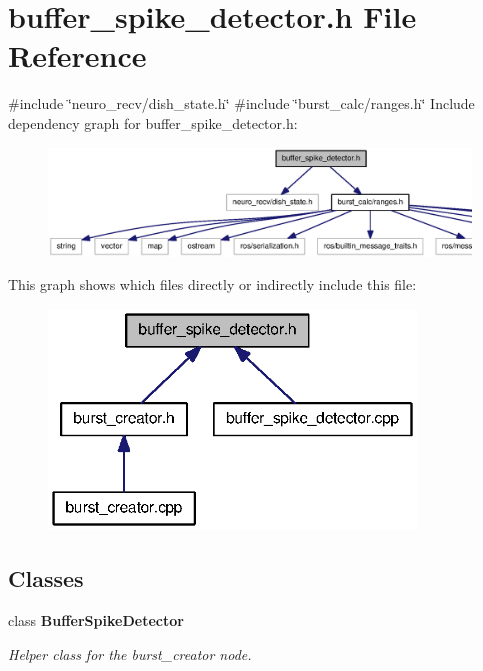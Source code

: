 \section{buffer\-\_\-spike\-\_\-detector.\-h \-File \-Reference}
\label{buffer__spike__detector_8h}
{\ttfamily \#include \char`\"{}neuro\-\_\-recv/dish\-\_\-state.\-h\char`\"{}}\*
{\ttfamily \#include \char`\"{}burst\-\_\-calc/ranges.\-h\char`\"{}}\*
\-Include dependency graph for buffer\-\_\-spike\-\_\-detector.\-h\-:\nopagebreak
\begin{figure}[H]
\begin{center}
\leavevmode
\includegraphics[width=350pt]{buffer__spike__detector_8h__incl}
\end{center}
\end{figure}
\-This graph shows which files directly or indirectly include this file\-:\nopagebreak
\begin{figure}[H]
\begin{center}
\leavevmode
\includegraphics[width=277pt]{buffer__spike__detector_8h__dep__incl}
\end{center}
\end{figure}
\subsection*{\-Classes}
\begin{DoxyCompactItemize}
\item 
class {\bf \-Buffer\-Spike\-Detector}
\begin{DoxyCompactList}\small\item\em \-Helper class for the burst\-\_\-creator node. \end{DoxyCompactList}\end{DoxyCompactItemize}

